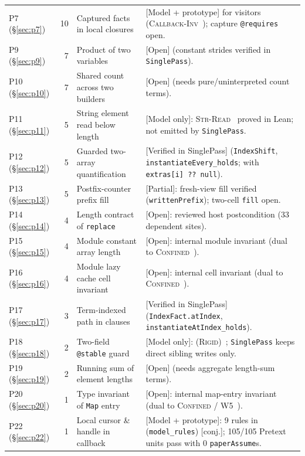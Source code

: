 \documentclass[10pt,a4paper]{article}
\newcommand{\code}[1]{\textcolor{codec}{\texttt{#1}}}
\newcommand{\lean}[1]{\texttt{\small #1}}
\newcommand{\ruleName}[1]{\textcolor{rulec}{\textsc{#1}}}
\newcommand{\status}[1]{\textcolor{leanc}{\textsf{\small[#1]}}}
\newcommand{\statusc}[1]{\textcolor{conjc}{\textsf{\small[#1]}}}
\newcommand{\statuso}[1]{\textcolor{accent}{\textsf{\small[#1]}}}
\renewcommand{\lean}[1]{\textcolor{leanc}{\texttt{\small #1}}}%
\begin{document}
\begin{table}[!htbp]
\begin{tabularx}{\textwidth}{@{}l r >{\raggedright\arraybackslash}p{} >{\raggedright\arraybackslash}X@{}}
P7 (\S\ref{sec:p7}) & 10 & Captured facts in local closures & \statuso{Model + prototype} for visitors (\ruleName{Callback-Inv}~\cite{el}); capture \code{@requires} open.\\
P9 (\S\ref{sec:p9}) & 7 & Product of two variables & \statusc{Open} (constant strides verified in \lean{SinglePass}).\\
P10 (\S\ref{sec:p10}) & 7 & Shared count across two builders & \statusc{Open} (needs pure/uninterpreted count terms).\\
P11 (\S\ref{sec:p11}) & 5 & String element read below length & \statusc{Model only}: \ruleName{Str-Read}~\cite{tf} proved in Lean; not emitted by \lean{SinglePass}.\\
P12 (\S\ref{sec:p12}) & 5 & Guarded two-array quantification & \status{Verified in SinglePass} (\lean{IndexShift}, \lean{instantiateEvery\_holds}; with \code{extras[i] ?? null}).\\
P13 (\S\ref{sec:p13}) & 5 & Postfix-counter prefix fill & \statuso{Partial}: fresh-view fill verified (\lean{writtenPrefix}); two-cell \code{fill} open.\\
P14 (\S\ref{sec:p14}) & 4 & Length contract of \code{replace} & \statusc{Open}: reviewed host postcondition (33 dependent sites).\\
P15 (\S\ref{sec:p15}) & 4 & Module constant array length & \statusc{Open}: internal module invariant (dual to \ruleName{Confined}~\cite{el}).\\
P16 (\S\ref{sec:p16}) & 4 & Module lazy cache cell invariant & \statusc{Open}: internal cell invariant (dual to \ruleName{Confined}~\cite{el}).\\
P17 (\S\ref{sec:p17}) & 3 & Term-indexed path in clauses & \status{Verified in SinglePass} (\lean{IndexFact.atIndex}, \lean{instantiateAtIndex\_holds}).\\
P18 (\S\ref{sec:p18}) & 2 & Two-field \code{@stable} guard & \statusc{Model only}: \ruleName{(Rigid)}~\cite{tf}; \lean{SinglePass} keeps direct sibling writes only.\\
P19 (\S\ref{sec:p19}) & 2 & Running sum of element lengths & \statusc{Open} (needs aggregate length-sum terms).\\
P20 (\S\ref{sec:p20}) & 1 & Type invariant of \code{Map} entry & \statusc{Open}: internal map-entry invariant (dual to \ruleName{Confined} / W5~\cite{el}).\\
P22 (\S\ref{sec:p22}) & 1\rlap{\textsuperscript{\dag}} & Local cursor \& handle in callback & \statuso{Model + prototype}: 9 rules in~\cite{el} (\lean{model\_rules}) \statusc{conj.}; 105/105 Pretext units pass with 0 \code{paperAssume}s.\\

\end{tabularx}
\end{table}
\end{document}
